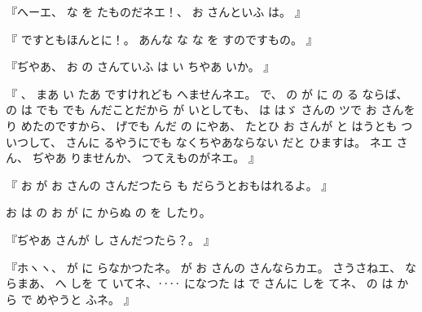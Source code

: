 %
『へーエ、
%
な
を
たものだネエ！、
%
お
さんといふ
は。
』

%
『
ですともほんとに！。
%
あんな
な
な
を
すのですもの。
』

%
『ぢやあ、
%
お
の
さんていふ
は
い
ちやあ
いか。
』

%
『
、
%
まあ
い
たあ
ですけれども
へませんネエ。
%
で、
%
の
が
に
の
る
ならば、
%
の
は
でも
でも
んだことだから
が
いとしても、
%
は
はゞ
さんの
ツで
お
さんを
り
めたのですから、
%
げでも
んだ
の
にやあ、
%
たとひ
お
さんが
と
はうとも
つ
いつして、
%
さんに
るやうにでも
なくちやあならない
だと
ひますは。
%
ネエ
さん、
%
ぢやあ
りませんか、
%
つてえものがネエ。
』

%
『
お
が
お
さんの
さんだつたら
も
だらうとおもはれるよ。
』

%
お
は
の
お
が
に
からぬ
の
を
したり。

%
『ぢやあ
さんが
し
さんだつたら？。
』

%
『ホヽヽ、
%
が
に
らなかつたネ。
%
が
お
さんの
さんならカエ。
%
さうさねエ、
%
ならまあ、
%
へ
しを
て
いてネ、‥‥
になつた
は
で
さんに
しを
てネ、
%
の
は
から
で
めやうと
ふネ。
』

